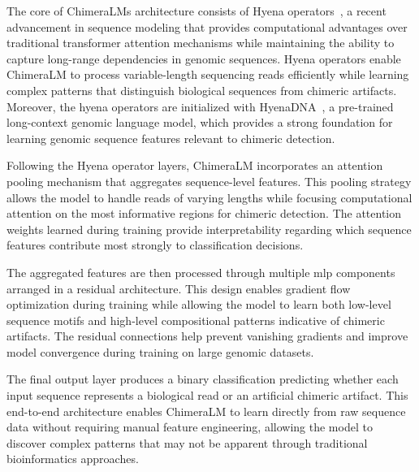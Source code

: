 \documentclass[pdflatex,sn-nature]{sn-jnl}%
\theoremstyle{thmstyleone}%
\theoremstyle{thmstyletwo}%
\theoremstyle{thmstylethree}%
\begin{document}
The core of ChimeraLM\textquotesingle s architecture consists of Hyena operators~\cite{Poli2023HyenaHT}, a recent advancement in sequence modeling that provides computational advantages over traditional transformer attention mechanisms while maintaining the ability to capture long-range dependencies in genomic sequences.
Hyena operators enable ChimeraLM to process variable-length sequencing reads efficiently while learning complex patterns that distinguish biological sequences from chimeric artifacts.
Moreover, the hyena operators are initialized with HyenaDNA~\cite{nguyen2023hyenadna}, a pre-trained long-context genomic language model, which provides a strong foundation for learning genomic sequence features relevant to chimeric detection.

Following the Hyena operator layers, ChimeraLM incorporates an attention pooling mechanism that aggregates sequence-level features.
This pooling strategy allows the model to handle reads of varying lengths while focusing computational attention on the most informative regions for chimeric detection.
The attention weights learned during training provide interpretability regarding which sequence features contribute most strongly to classification decisions.

The aggregated features are then processed through multiple \gls{mlp} components arranged in a residual architecture.
This design enables gradient flow optimization during training while allowing the model to learn both low-level sequence motifs and high-level compositional patterns indicative of chimeric artifacts.
The residual connections help prevent vanishing gradients and improve model convergence during training on large genomic datasets.

The final output layer produces a binary classification predicting whether each input sequence represents a biological read or an artificial chimeric artifact.
This end-to-end architecture enables ChimeraLM to learn directly from raw sequence data without requiring manual feature engineering, allowing the model to discover complex patterns that may not be apparent through traditional bioinformatics approaches.
\end{document}
